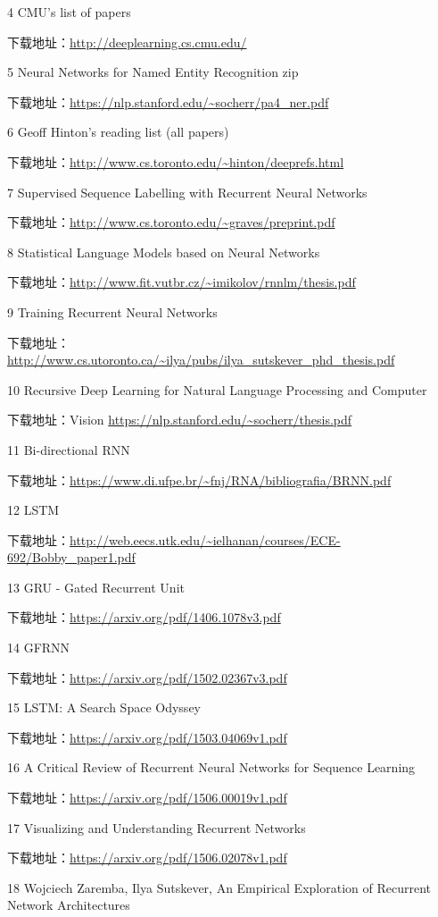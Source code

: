 \documentclass[]{ctexbook}
\begin{document}
4 CMU's list of papers

下载地址：\url{http://deeplearning.cs.cmu.edu/}

5 Neural Networks for Named Entity Recognition zip

下载地址：\url{https://nlp.stanford.edu/~socherr/pa4_ner.pdf}

6 Geoff Hinton's reading list (all papers)

下载地址：\url{http://www.cs.toronto.edu/~hinton/deeprefs.html}

7 Supervised Sequence Labelling with Recurrent Neural Networks

下载地址：\url{http://www.cs.toronto.edu/~graves/preprint.pdf}

8 Statistical Language Models based on Neural Networks

下载地址：\url{http://www.fit.vutbr.cz/~imikolov/rnnlm/thesis.pdf}

9 Training Recurrent Neural Networks

下载地址：\url{http://www.cs.utoronto.ca/~ilya/pubs/ilya_sutskever_phd_thesis.pdf}

10 Recursive Deep Learning for Natural Language Processing and Computer

下载地址：Vision \url{https://nlp.stanford.edu/~socherr/thesis.pdf}

11 Bi-directional RNN

下载地址：\url{https://www.di.ufpe.br/~fnj/RNA/bibliografia/BRNN.pdf}

12 LSTM

下载地址：\url{http://web.eecs.utk.edu/~ielhanan/courses/ECE-692/Bobby_paper1.pdf}

13 GRU - Gated Recurrent Unit

下载地址：\url{https://arxiv.org/pdf/1406.1078v3.pdf}

14 GFRNN

下载地址：\url{https://arxiv.org/pdf/1502.02367v3.pdf}

15 LSTM: A Search Space Odyssey

下载地址：\url{https://arxiv.org/pdf/1503.04069v1.pdf}

16 A Critical Review of Recurrent Neural Networks for Sequence Learning

下载地址：\url{https://arxiv.org/pdf/1506.00019v1.pdf}

17 Visualizing and Understanding Recurrent Networks

下载地址：\url{https://arxiv.org/pdf/1506.02078v1.pdf}

18 Wojciech Zaremba, Ilya Sutskever, An Empirical Exploration of Recurrent Network Architectures
\end{document}
